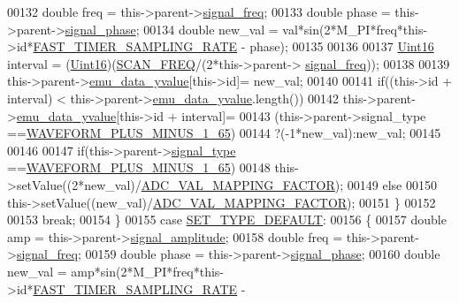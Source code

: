 \begin{DoxyCode}
00132         \textcolor{keywordtype}{double} freq    = this->parent->\hyperlink{a00008_a67039999d520fc483fab521fae5ddde4}{signal\_freq};
00133         \textcolor{keywordtype}{double} phase   = this->parent->\hyperlink{a00008_af08de88fdfe283086e3cca97a2965678}{signal\_phase};
00134         \textcolor{keywordtype}{double} new\_val = val*sin(2*M\_PI*freq*this->\textcolor{keywordtype}{id}*\hyperlink{a00086_a3a4dcb8af26a561d90607a41a3745806}{FAST\_TIMER\_SAMPLING\_RATE} - 
      phase);
00135 
00136 
00137         \hyperlink{a00004_aae7407b021d43f7193a81a58cfb3e297}{Uint16} interval = (\hyperlink{a00004_aae7407b021d43f7193a81a58cfb3e297}{Uint16})(\hyperlink{a00086_a8127170b687c1f67a968886c128e76e4}{SCAN\_FREQ}/(2*this->parent->
      \hyperlink{a00008_a67039999d520fc483fab521fae5ddde4}{signal\_freq}));
00138 
00139         this->parent->\hyperlink{a00008_ad922d05d1e988d84f404c115fe909f72}{emu\_data\_yvalue}[this->id]= new\_val;
00140 
00141        \textcolor{keywordflow}{if}((this->\textcolor{keywordtype}{id} + interval) < this->parent->\hyperlink{a00008_ad922d05d1e988d84f404c115fe909f72}{emu\_data\_yvalue}.length())
00142         this->parent->\hyperlink{a00008_ad922d05d1e988d84f404c115fe909f72}{emu\_data\_yvalue}[this->id + interval]=
00143         (this->parent->signal\_type ==\hyperlink{a00090_a0923d3b365a36e1e8c401cec964aa36f}{WAVEFORM\_PLUS\_MINUS\_1\_65})
00144         ?(-1*new\_val):new\_val;
00145 
00146 
00147         \textcolor{keywordflow}{if}(this->parent->\hyperlink{a00008_a070edaec5aee6ba1f5a6866bc32c8ce4}{signal\_type} ==\hyperlink{a00090_a0923d3b365a36e1e8c401cec964aa36f}{WAVEFORM\_PLUS\_MINUS\_1\_65})
00148         this->setValue((2*new\_val)/\hyperlink{a00086_ada92d3eeeec0cbeee41e76a52d145792}{ADC\_VAL\_MAPPING\_FACTOR});
00149         \textcolor{keywordflow}{else}
00150         this->setValue((new\_val)/\hyperlink{a00086_ada92d3eeeec0cbeee41e76a52d145792}{ADC\_VAL\_MAPPING\_FACTOR});
00151         \}
00152 
00153     \textcolor{keywordflow}{break};
00154      \}
00155     \textcolor{keywordflow}{case} \hyperlink{a00090_afd1036bf6329d2ac31913e14c1f56725}{SET\_TYPE\_DEFAULT}:
00156     \{
00157         \textcolor{keywordtype}{double} amp     = this->parent->\hyperlink{a00008_a73dabe63bd74afe2776e8136211dc36e}{signal\_amplitude};
00158         \textcolor{keywordtype}{double} freq    = this->parent->\hyperlink{a00008_a67039999d520fc483fab521fae5ddde4}{signal\_freq};
00159         \textcolor{keywordtype}{double} phase   = this->parent->\hyperlink{a00008_af08de88fdfe283086e3cca97a2965678}{signal\_phase};
00160         \textcolor{keywordtype}{double} new\_val = amp*sin(2*M\_PI*freq*this->\textcolor{keywordtype}{id}*\hyperlink{a00086_a3a4dcb8af26a561d90607a41a3745806}{FAST\_TIMER\_SAMPLING\_RATE} - 

\end{DoxyCode}
